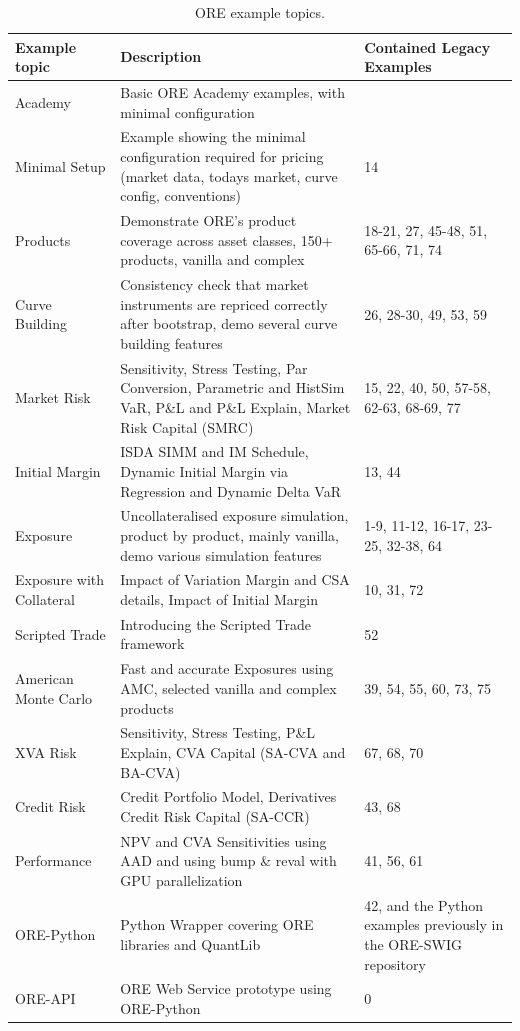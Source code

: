 \begin{table}[hbt]
\scriptsize
\begin{center}
\begin{tabular}{|l|p{6cm}|p{4cm}|}
\hline
Example topic & Description & Contained Legacy Examples\\
\hline
\hline
Academy & Basic ORE Academy examples, with minimal configuration & \\
\hline
Minimal Setup & Example showing the minimal configuration required 
for pricing (market data, todays market, curve config, conventions)
& 14 \\
\hline
Products & Demonstrate ORE's product coverage across asset classes,
150+ products, vanilla and complex
& 18-21, 27, 45-48, 51, 65-66, 71, 74\\
\hline
Curve Building & Consistency check that market instruments are repriced correctly
after bootstrap, demo several curve building features
& 26, 28-30, 49, 53, 59 \\
\hline
Market Risk & Sensitivity, Stress Testing, Par Conversion, Parametric and HistSim VaR,
P\&L and P\&L Explain, Market Risk Capital (SMRC)
& 15, 22, 40, 50, 57-58, 62-63, 68-69, 77\\
\hline
Initial Margin & ISDA SIMM and IM Schedule, Dynamic Initial Margin via Regression
and Dynamic Delta VaR
& 13, 44\\
\hline
Exposure & Uncollateralised exposure simulation, product by product, mainly vanilla,
demo various simulation features
& 1-9, 11-12, 16-17, 23-25, 32-38, 64\\
\hline
Exposure with Collateral & Impact of Variation Margin and CSA details,
Impact of Initial Margin
& 10, 31, 72\\
\hline
Scripted Trade & Introducing the Scripted Trade framework
& 52 \\
\hline
American Monte Carlo & Fast and accurate Exposures using AMC,
selected vanilla and complex products
& 39, 54, 55, 60, 73, 75\\
\hline
XVA Risk & Sensitivity, Stress Testing, P\&L Explain,
CVA Capital (SA-CVA and BA-CVA)
& 67, 68, 70\\
\hline
Credit Risk & Credit Portfolio Model, Derivatives Credit Risk Capital (SA-CCR)
& 43, 68\\
\hline
Performance & NPV and CVA Sensitivities using AAD
and using bump \& reval with GPU parallelization
& 41, 56, 61\\
\hline
ORE-Python & Python Wrapper covering ORE libraries and QuantLib
& 42, and the Python examples previously in the ORE-SWIG repository\\
\hline
ORE-API & ORE Web Service prototype using ORE-Python
& 0\\
\hline
\end{tabular}
\caption{ORE example topics.}
\label{tab_0}
\end{center}
\end{table}
\clearpage

